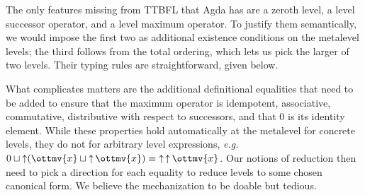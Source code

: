 \documentclass[a4paper,UKenglish,cleveref,autoref,thm-restate]{lipics-v2021}
\makeatletter
\newcommand{\lang}{TTBFL\@\xspace}
\newcommand{\eg}{\textit{e.g.}\@\xspace}
\makeatother
\begin{document}
The only features missing from \lang that Agda has are a zeroth level,
a level successor operator, and a level maximum operator.
To justify them semantically,
we would impose the first two as additional existence conditions on the metalevel levels;
the third follows from the total ordering, which lets us pick the larger of two levels.
Their typing rules are straightforward, given below.
%

What complicates matters are the additional definitional equalities that need to be added
to ensure that the maximum operator is idempotent, associative, commutative,
distributive with respect to successors,
and that $0$ is its identity element.
While these properties hold automatically at the metalevel for concrete levels,
they do not for arbitrary level expressions,
\eg $   0   \sqcup   \mathop{\uparrow}   (  \ottmv{x}  \sqcup   \mathop{\uparrow}  \ottmv{x}   )     \equiv   \mathop{\uparrow}   \mathop{\uparrow}  \ottmv{x}   $.
Our notions of reduction then need to pick a direction for each equality
to reduce levels to some chosen canonical form.
We believe the mechanization to be doable but tedious.
\end{document}
